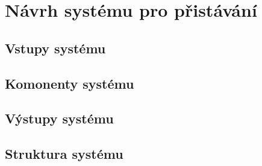 \chapter{Návrh systému pro přistávání}
  \section{Vstupy systému}
  \section{Komonenty systému}
  \section{Výstupy systému}
  \section{Struktura systému}